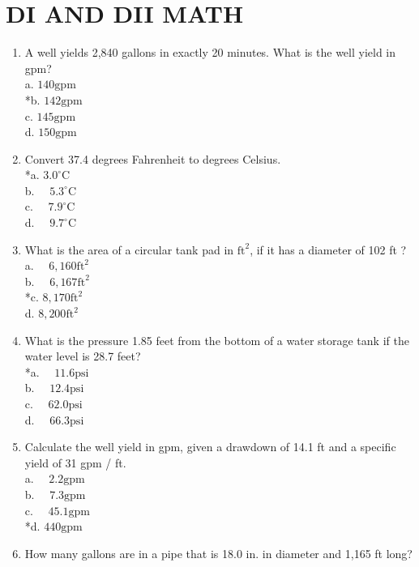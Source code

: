 \section{DI AND DII MATH}
\begin{enumerate}
  \item A well yields 2,840 gallons in exactly 20 minutes. What is the well yield in gpm?\\
a. $140 \mathrm{gpm}$\\
*b. $142 \mathrm{gpm}$\\
c. $145 \mathrm{gpm}$\\
d. $150 \mathrm{gpm}$\\
  \item Convert 37.4 degrees Fahrenheit to degrees Celsius.\\
*a. $3.0^{\circ} \mathrm{C}$\\
b. $\quad 5.3^{\circ} \mathrm{C}$\\
c. $\quad 7.9^{\circ} \mathrm{C}$\\
d. $\quad 9.7^{\circ} \mathrm{C}$\\
  \item What is the area of a circular tank pad in $\mathrm{ft}^{2}$, if it has a diameter of 102 ft ?\\
a. $\quad 6,160 \mathrm{ft}^{2}$\\
b. $\quad 6,167 \mathrm{ft}^{2}$\\
*c. $8,170 \mathrm{ft}^{2}$\\
d. $8,200 \mathrm{ft}^{2}$\\
  \item What is the pressure 1.85 feet from the bottom of a water storage tank if the water level is 28.7 feet?\\
*a. $\quad 11.6 \mathrm{psi}$\\
b. $\quad 12.4 \mathrm{psi}$\\
c. $\quad 62.0 \mathrm{psi}$\\
d. $\quad 66.3 \mathrm{psi}$\\
  \item Calculate the well yield in gpm, given a drawdown of 14.1 ft and a specific yield of 31 gpm / ft.\\
a. $\quad 2.2 \mathrm{gpm}$\\
b. $\quad 7.3 \mathrm{gpm}$\\
c. $\quad 45.1 \mathrm{gpm}$\\
*d. $440 \mathrm{gpm}$\\
  \item How many gallons are in a pipe that is 18.0 in. in diameter and 1,165 ft long?\\

\end{enumerate}
